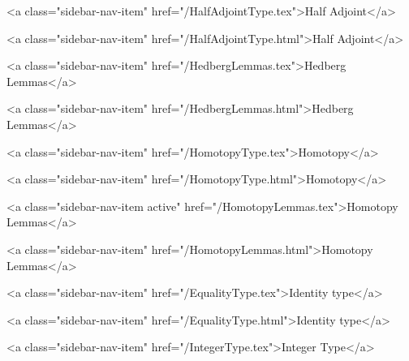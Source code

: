           <a class="sidebar-nav-item" href="/HalfAdjointType.tex">Half Adjoint</a>
        
      
    
      
        
          <a class="sidebar-nav-item" href="/HalfAdjointType.html">Half Adjoint</a>
        
      
    
      
        
          <a class="sidebar-nav-item" href="/HedbergLemmas.tex">Hedberg Lemmas</a>
        
      
    
      
        
          <a class="sidebar-nav-item" href="/HedbergLemmas.html">Hedberg Lemmas</a>
        
      
    
      
        
          <a class="sidebar-nav-item" href="/HomotopyType.tex">Homotopy</a>
        
      
    
      
        
          <a class="sidebar-nav-item" href="/HomotopyType.html">Homotopy</a>
        
      
    
      
        
          <a class="sidebar-nav-item active" href="/HomotopyLemmas.tex">Homotopy Lemmas</a>
        
      
    
      
        
          <a class="sidebar-nav-item" href="/HomotopyLemmas.html">Homotopy Lemmas</a>
        
      
    
      
        
          <a class="sidebar-nav-item" href="/EqualityType.tex">Identity type</a>
        
      
    
      
        
          <a class="sidebar-nav-item" href="/EqualityType.html">Identity type</a>
        
      
    
      
        
          <a class="sidebar-nav-item" href="/IntegerType.tex">Integer Type</a>
        
      
    
      
        
